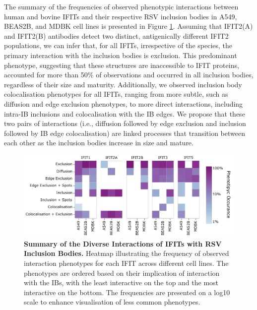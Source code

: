 The summary of the frequencies of observed phenotypic interactions between human and bovine IFITs and their respective RSV inclusion bodies in A549, BEAS2B, and MDBK cell lines is presented in Figure \ref{fig:Summary of the Diverse Interactions of IFITs with RSV Inclusion Bodies}. Assuming that IFIT2(A) and IFIT2(B) antibodies detect two distinct, antigenically different IFIT2 populations, we can infer that, for all IFITs, irrespective of the species, the primary interaction with the inclusion bodies is exclusion. This predominant phenotype, suggesting that these structures are inaccessible to IFIT proteins, accounted for more than 50\% of observations and occurred in all inclusion bodies, regardless of their size and maturity. Additionally, we observed inclusion body colocalisation phenotypes for all IFITs, ranging from more subtle, such as diffusion and edge exclusion phenotypes, to more direct interactions, including intra-IB inclusions and colocalisation with the IB edges. We propose that these two pairs of interactions (i.e., diffusion followed by edge exclusion and inclusion followed by IB edge colocalisation) are linked processes that transition between each other as the inclusion bodies increase in size and mature.

\begin{figure}
    \centering
    \includegraphics[width=1\linewidth]{08. Chapter 3/Figs/heatmap_infection.pdf}
    \caption[Summary of the Diverse Interactions of IFITs with RSV Inclusion Bodies.]{\textbf{Summary of the Diverse Interactions of IFITs with RSV Inclusion Bodies.} Heatmap illustrating the frequency of observed interaction phenotypes for each IFIT across different cell lines. The phenotypes are ordered based on their implication of interaction with the IBs, with the least interactive on the top and the most interactive on the bottom. The frequencies are presented on a log10 scale to enhance visualisation of less common phenotypes.}
    \label{fig:Summary of the Diverse Interactions of IFITs with RSV Inclusion Bodies}
\end{figure}

